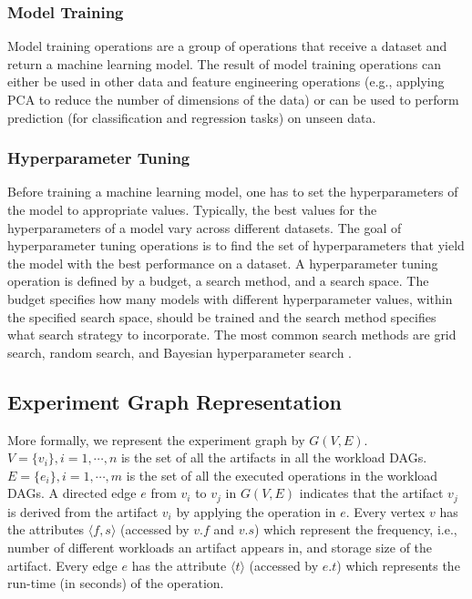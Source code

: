 \subsubsection{Model Training}
Model training operations are a group of operations that receive a dataset and return a machine learning model.
The result of model training operations can either be used in other data and feature engineering operations (e.g., applying PCA to reduce the number of dimensions of the data) or can be used to perform prediction (for classification and regression tasks) on unseen data.

\subsubsection{Hyperparameter Tuning}
Before training a machine learning model, one has to set the hyperparameters of the model to appropriate values.
Typically, the best values for the hyperparameters of a model vary across different datasets.
The goal of hyperparameter tuning operations is to find the set of hyperparameters that yield the model with the best performance on a dataset.
A hyperparameter tuning operation is defined by a budget, a search method, and a search space.
The budget specifies how many models with different hyperparameter values, within the specified search space, should be trained and the search method specifies what search strategy to incorporate.
The most common search methods are grid search, random search, and Bayesian hyperparameter search \cite{bergstra2012random,snoek2012practical}.


\subsection{Experiment Graph Representation}\label{sub-graph-construction}
More formally, we represent the experiment graph by $G(V, E)$.
$V=\{v_i\}, i = 1, \cdots, n$ is the set of all the artifacts in all the workload DAGs.
$E=\{e_i\}, i = 1, \cdots, m$ is the set of all the executed operations in the workload DAGs.
A directed edge $e$ from $v_i$ to $v_j$ in $G(V, E)$ indicates that the artifact $v_j$ is derived from the artifact $v_i$ by applying the operation in $e$.
Every vertex $v$ has the attributes $\langle f, s \rangle$ (accessed by $v.f$ and $v.s$) which represent the frequency, i.e., number of different workloads an artifact appears in, and storage size of the artifact.
Every edge $e$ has the attribute $\langle t \rangle$ (accessed by $e.t$) which represents the run-time (in seconds) of the operation.

